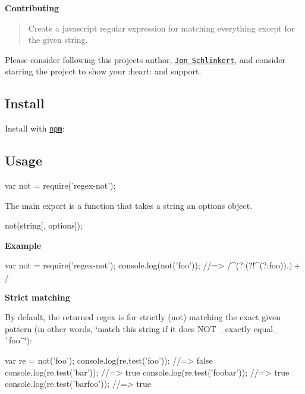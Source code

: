 {\bfseries Contributing}

\begin{quote}
Create a javascript regular expression for matching everything except for the given string. \end{quote}


Please consider following this project\textquotesingle{}s author, \href{https://github.com/jonschlinkert}{\tt Jon Schlinkert}, and consider starring the project to show your \+:heart\+: and support.

\subsection*{Install}

Install with \href{https://www.npmjs.com/}{\tt npm}\+:




\subsection*{Usage}


\begin{DoxyCode}
var not = require('regex-not');
\end{DoxyCode}


The main export is a function that takes a string an options object.


\begin{DoxyCode}
not(string[, options]);
\end{DoxyCode}


{\bfseries Example}


\begin{DoxyCode}
var not = require('regex-not');
console.log(not('foo'));
//=> /^(?:(?!^(?:foo)$).)+$/
\end{DoxyCode}


{\bfseries Strict matching}

By default, the returned regex is for strictly (not) matching the exact given pattern (in other words, \char`\"{}match this string if it does N\+O\+T \+\_\+exactly equal\+\_\+ \`{}foo\`{}\char`\"{})\+:


\begin{DoxyCode}
var re = not('foo');
console.log(re.test('foo'));     //=> false
console.log(re.test('bar'));     //=> true
console.log(re.test('foobar'));  //=> true
console.log(re.test('barfoo'));  //=> true
\end{DoxyCode}


